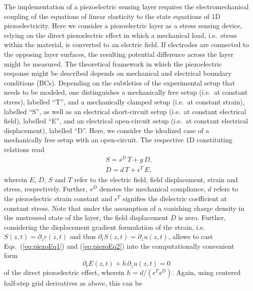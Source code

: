 \documentclass[5p,times,twocolumn]{elsarticle}
\begin{document}
The implementation of a piezoelectric sensing layer requires the
electromechanical coupling of the equations of linear elasticity to the state
equations of $1$D piezoelectricity.  Here we consider a piezoelectric layer as
a stress sensing device, relying on the direct piezoelectric effect in which a
mechanical load, i.e.\ stress within the material, is converted to an electric
field. If electrodes are connected to the opposing layer surfaces, the
resulting potential difference across the layer might be measured.  The
theoretical framework in which the piezoelectric response might be described
depends on mechanical and electrical boundary conditions (BCs).  Depending on
the subtleties of the experimental setup that needs to be modeled, one
distinguishes a mechanically free setup (i.e.\ at constant stress), labelled
``T'', and a mechanically clamped setup (i.e.\ at constant strain), labelled
``S'', as well as an electrical short-circuit setup (i.e.\ at constant
electrical field), labelled ``E'', and an electrical open-circuit setup (i.e.\
at constant electrical displacement), labelled ``D''.  Here, we consider the
idealized case of a mechanically free setup with an open-circuit. 
The respective $1$D constituting relations read
\begin{subequations}
\begin{align}
&S = s^{D}\,T + g\,D, \label{eq:piezoEq1} \\
&D = d\, T + \epsilon^T\,E,\label{eq:piezoEq2}
\end{align}
\end{subequations}
wherein $E$, $D$, $S$ and $T$ refer to the electric field, field displacement,
strain and stress, respectively. Further, $s^{D}$ denotes the mechanical
compliance, $d$ refers to the piezoelectric strain constant and $\epsilon^{T}$
signifies the dielectric coefficient
at constant stress.
Note that under the assumption of a vanishing charge density in the unstressed
state of the layer, the field displacement $D$ is zero. Further, considering
the displacement gradient formulation of the strain, i.e.\ $S(z,t) = \partial_z
r(z,t)$ and thus $\partial_t S(z,t) = \partial_z u(z,t)$, 
allows to cast Eqs.\ (\ref{eq:piezoEq1}) and (\ref{eq:piezoEq2}) into
the computationally convenient form
\begin{equation}
\partial_t E(z,t) + h \, \partial_z u(z,t) = 0 \label{eq:piezoEl_cont}
\end{equation}
of the direct piezoelectric effect, wherein $h = d/(\epsilon^{T} s^{D})$.
Again, using centered half-step grid derivatives as above, this can be 
\end{document}
